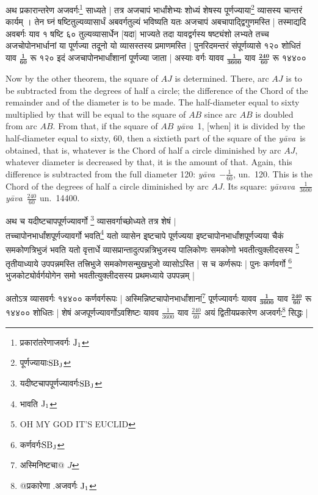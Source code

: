 \documentclass[11pt,a5paper]{book}
\def\yava{\textit{y\=ava}}
\def\yavava{\textit{y\=avava}}
\begin{document}
\newpage
{\s अथ
प्रकारान्तरेण अजवर्गः\footnote{{\s प्रकारांतरेणाजवर्गः }${\rm J_1}$}
साध्यते |
तत्र अजचापं भार्धांशेभ्यः शोध्यं शेषस्य
पूर्णज्याया\footnote{{\s पूर्णज्यायाः}${\rm SB_J}$} व्यासस्य चान्तरं कार्यम् । तेन घ्नं षष्टितुल्यव्यासार्धं
अबवर्गतुल्यं भविष्यति
यतः अजचापं अबचापाद्द्विगुणमस्ति |
तस्माद्यदि अवबर्गः
याव १ षष्टि ६० तुल्यव्यासार्धेन [यदा] भाज्यते तदा यावद्वर्गस्य
षष्ट्यंशो लभ्यते तच्च अजचोपोनभार्धानां या पूर्णज्या
तदूनो यो व्यासस्तस्य प्रमाणमस्ति |
पुनरिदमन्तरं संपूर्णव्यासे १२० शोधितं
याव $\bm{\frac{\dot {1}}{60}}$ रू १२०
इदं अजचापोनभार्धांशानां पूर्णज्या जाता |
अस्याः वर्गः %
यावव $\bm{\frac{1}{3600}}$ याव $\bm{\frac{\dot{240}}{60}}$
रू १४४००}


\newpage
Now by the other theorem, the square of $AJ$ is determined. There, arc $AJ$ is to be subtracted
from the degrees of half a circle; the difference of the Chord of the remainder 
and of the diameter is to be made. The half-diameter equal to sixty multiplied by that
will be equal to the square of $AB$ since arc $AB$ is doubled from arc $AB$. 
From that, if the square of $AB$ \yava\ 1, [when] it is divided by the half-diameter equal to sixty, 60, 
then a sixtieth part of the square of the \yava\ is obtained, that is, whatever is the Chord of half a 
circle diminished by arc $AJ$, whatever diameter is decreased by that, it is the amount of that.
Again, this difference is subtracted from the full diameter 120:
\yava\ $-\frac{1}{60}$, un.\ 120. This is the Chord of the
degrees of half a circle diminished by arc $AJ$. Its square: 
\yavava\ $\frac{1}{3600}$ \yava\ $\frac{\dot{240}}{60}$ un.\ 14400.

\newpage
{\s अथ च यदीष्टचापपूर्णज्यावर्गो \footnote{{\s यदीष्टचापपूर्णज्यावर्गः}${\rm SB_J}$} व्यासवर्गाच्छोध्यते
तत्र शेषं
$|$ \\
तच्चापोनभार्धांशपूर्णज्यावर्गो
भवति\footnote{{\s भावति }${\rm J_1}$}
यतो व्यासेन इ्ष्टचापे पूर्णज्यया इष्टचापोनभार्धांशपूर्णज्यया
चैकं समकोणत्रि\-भुजं भवति यतो वृत्तार्धे व्यासप्रान्तादुत्पन्नत्रिभुजस्य
पालिकोणः समकोणो
भवतीत्युक्लीदसस्य \footnote{OH MY GOD IT'S EUCLID}
तृतीयाध्याये
उपपन्न\-मस्ति 
तत्त्रिभुजे
समकोणसन्मुखभुजो व्यासोऽस्ति |
स च कर्णरूपः |
पुनः कर्णवर्गो \footnote{{\s कर्णवर्गः}${\rm SB_J}$} भुजकोट्योर्वर्गयोगेन समो
भवतीत्युक्लीदसस्य
प्रथमध्याये
उपपन्नम् |

अतोऽत्र व्यासवर्गः १४४०० कर्णवर्गरूपः |
अस्मिन्निष्टचापोनभार्धांशानां\footnote{{\s अस्मिनिष्टचा@} $J$} पूर्णज्यावर्गः
यावव $\bm{\frac{1}{3600}}$ याव $\bm{\frac{\dot{240}}{60}}$
रू १४४००
शोधितः | शेषं अजपूर्णज्यावर्गोऽवशिष्टः 
यावव %
$\frac{\dot{1}}{3600}$ याव $\frac{240}{60}$ अयं
द्वितीयप्रकारेण अजवर्गः\footnote{{\s @प्रकारेणा .अजवर्गः }${\rm J_1}$}
सिद्धः |}
\end{document}

